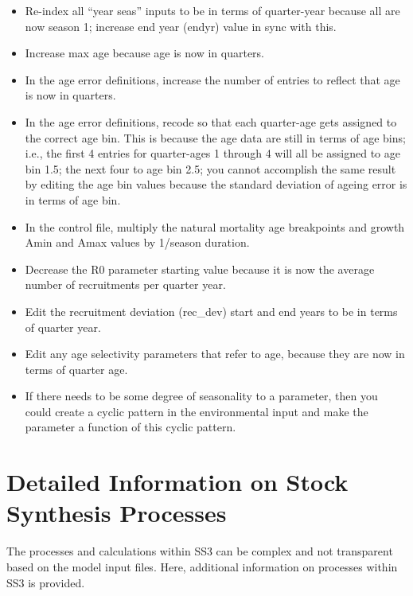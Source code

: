 \begin{itemize}
	\item Re-index all ``year seas'' inputs to be in terms of quarter-year because all are now season 1; increase end year (endyr) value in sync with this.
	\item Increase max age because age is now in quarters.
	\item In the age error definitions, increase the number of entries to reflect that age is now in quarters.
	\item In the age error definitions, recode so that each quarter-age gets assigned to the correct age bin. This is because the age data are still in terms of age bins; i.e., the first 4 entries for quarter-ages 1 through 4 will all be assigned to age bin 1.5; the next four to age bin 2.5; you cannot accomplish the same result by editing the age bin values because the standard deviation of ageing error is in terms of age bin.
	\item In the control file, multiply the natural mortality age breakpoints and growth Amin and Amax values by 1/season duration.
	\item Decrease the R0 parameter starting value because it is now the average number of recruitments per quarter year.
	\item Edit the recruitment deviation (rec\_dev) start and end years to be in terms of quarter year.
	\item Edit any age selectivity parameters that refer to age, because they are now in terms of quarter age.
	\item If there needs to be some degree of seasonality to a parameter, then you could create a cyclic pattern in the environmental input and make the parameter a function of this cyclic pattern.
\end{itemize}

\pagebreak

\section{Detailed Information on Stock Synthesis Processes}

The processes and calculations within SS3 can be complex and not transparent based on the model input files. Here, additional information on processes within SS3 is provided.

